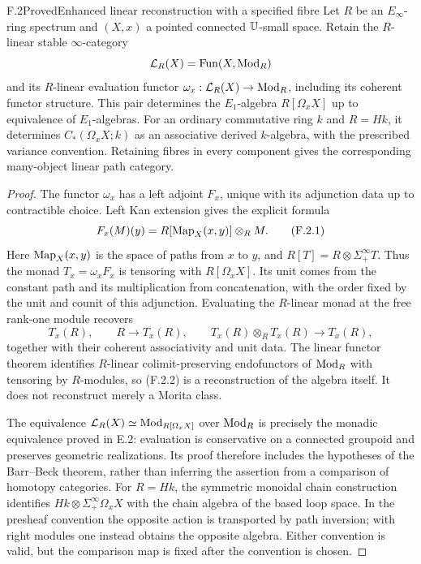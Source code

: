 \begin{claim}{F.2}{Proved}{Enhanced linear reconstruction with a specified fibre}
Let $R$ be an $E_\infty$-ring spectrum and $(X,x)$ a pointed connected
$\mathbb U$-small space.  Retain the $R$-linear stable $\infty$-category
\[
 \mathcal L_R(X)=\operatorname{Fun}(X,\operatorname{Mod}_R)
\]
and its $R$-linear evaluation functor
$\omega_x:\mathcal L_R(X)\to\operatorname{Mod}_R$, including its coherent
functor structure.  This pair determines the $E_1$-algebra
$R[\Omega_xX]$ up to equivalence of $E_1$-algebras.  For an
ordinary commutative ring $k$ and $R=Hk$, it determines
$C_*(\Omega_xX;k)$ as an associative derived $k$-algebra, with
the prescribed variance convention.  Retaining fibres in every
component gives the corresponding many-object linear path category.
\end{claim}
\begin{proof}
The functor $\omega_x$ has a left adjoint $F_x$, unique with its
adjunction data up to contractible choice.  Left Kan extension gives
the explicit formula
\[
 F_x(M)(y)=R[\operatorname{Map}_X(x,y)]\otimes_R M.
                                                               \tag{F.2.1}
\]
Here $\operatorname{Map}_X(x,y)$ is the space of paths from $x$ to $y$, and
$R[T]=R\otimes\Sigma^\infty_+T$.  Thus the monad
$T_x=\omega_xF_x$ is tensoring with $R[\Omega_xX]$.
Its unit comes from the constant path and its multiplication from
concatenation, with the order fixed by the unit and counit of this
adjunction.  Evaluating the $R$-linear monad at the free rank-one
module recovers
\[
 T_x(R),\qquad
 R\longrightarrow T_x(R),\qquad
 T_x(R)\otimes_R T_x(R)\longrightarrow T_x(R),                 \tag{F.2.2}
\]
together with their coherent associativity and unit data.  The
linear functor theorem
\citep[Theorem 4.8.4.1]{EF_LurieHA} identifies $R$-linear
colimit-preserving endofunctors of $\operatorname{Mod}_R$ with tensoring by
$R$-modules, so (F.2.2) is a reconstruction of the algebra itself.
It does not reconstruct merely a Morita class.

The equivalence
$\mathcal L_R(X)\simeq\operatorname{Mod}_{R[\Omega_xX]}$ over $\operatorname{Mod}_R$
is precisely the monadic equivalence proved in E.2: evaluation is
conservative on a connected groupoid and preserves geometric
realizations.  Its proof therefore includes the hypotheses of the
Barr--Beck theorem, rather than inferring the assertion from a
comparison of homotopy categories.
For $R=Hk$, the symmetric monoidal chain construction identifies
$Hk\otimes\Sigma^\infty_+\Omega_xX$ with the chain algebra of
the based loop space.  In the presheaf convention the opposite
action is transported by path inversion; with right modules one
instead obtains the opposite algebra.  Either convention is valid,
but the comparison map is fixed after the convention is chosen.


\end{proof}
